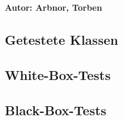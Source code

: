 
\textbf{Autor: Arbnor, Torben} \\

\subsection{Getestete Klassen}

\subsection{White-Box-Tests}

\subsection{Black-Box-Tests}
